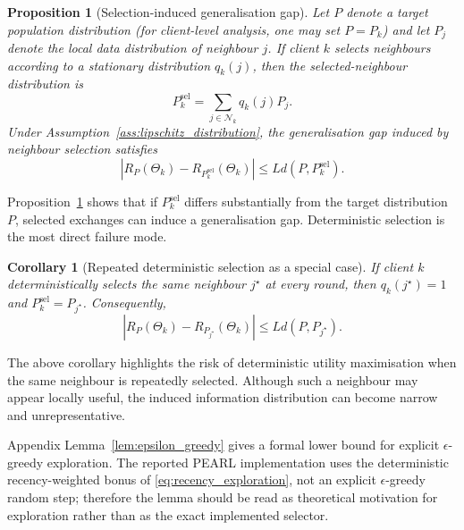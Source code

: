 \documentclass[conference]{IEEEtran}
\newcommand{\rev}[1]{#1}
\newtheorem{proposition}{Proposition}
\newtheorem{corollary}{Corollary}
\begin{document}
\begin{proposition}[Selection-induced generalisation gap]
\label{prop:selection_gap}
Let $P$ denote a target population distribution \rev{(for client-level analysis, one may set \(P=P_k\))} and let $P_j$ denote the local data distribution of neighbour $j$. If client $k$ selects neighbours according to a stationary distribution $q_k(j)$, then the selected-neighbour distribution is
\begin{equation*}
P_k^{\mathrm{sel}}
=
\sum_{j\in\mathcal{N}_k}
q_k(j)P_j.
\end{equation*}
Under Assumption~\ref{ass:lipschitz_distribution}, the generalisation gap induced by neighbour selection satisfies
\begin{equation*}
\left|
R_P(\Theta_k)
-
R_{P_k^{\mathrm{sel}}}(\Theta_k)
\right|
\leq
L d(P,P_k^{\mathrm{sel}}).
\end{equation*}
\end{proposition}

Proposition~\ref{prop:selection_gap} shows that if $P_k^{\mathrm{sel}}$ differs substantially from the target distribution $P$, selected exchanges can induce a generalisation gap. Deterministic selection is the most direct failure mode.

\begin{corollary}[Repeated deterministic selection as a special case]
\label{cor:deterministic_selection}
If client $k$ deterministically selects the same neighbour $j^\star$ at every round, then $q_k(j^\star)=1$ and $P_k^{\mathrm{sel}}=P_{j^\star}$. Consequently,
\begin{equation*}
\left|
R_P(\Theta_k)
-
R_{P_{j^\star}}(\Theta_k)
\right|
\leq
L d(P,P_{j^\star}).
\end{equation*}
\end{corollary}

The above corollary highlights the risk of deterministic utility maximisation when the same neighbour is repeatedly selected. Although such a neighbour may appear locally useful, the induced information distribution can become narrow and unrepresentative.

Appendix Lemma~\ref{lem:epsilon_greedy} gives a formal lower bound for explicit $\epsilon$-greedy exploration. The reported PEARL implementation uses the deterministic recency-weighted bonus of \eqref{eq:recency_exploration}, not an explicit $\epsilon$-greedy random step; therefore the lemma should be read as theoretical motivation for exploration rather than as the exact implemented selector.
\end{document}
